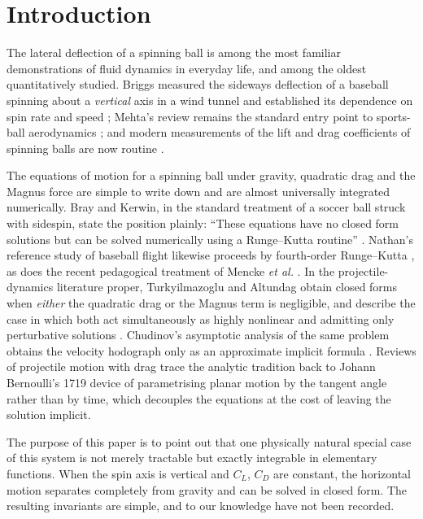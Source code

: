 \documentclass[aip,amsmath,amssymb,preprint,floatfix]{revtex4-2}
\begin{document}
\section{Introduction}
\label{sec:intro}

The lateral deflection of a spinning ball is among the most familiar demonstrations
of fluid dynamics in everyday life, and among the oldest quantitatively studied.
Briggs measured the sideways deflection of a baseball spinning about a
\emph{vertical} axis in a wind tunnel and established its dependence on spin rate
and speed \cite{Briggs1959}; Mehta's review remains the standard entry point to
sports-ball aerodynamics \cite{Mehta1985}; and modern measurements of the lift and
drag coefficients of spinning balls are now routine \cite{Nathan2008,KensrudSmith2018}.

The equations of motion for a spinning ball under gravity, quadratic drag and the
Magnus force are simple to write down and are almost universally integrated
numerically. Bray and Kerwin, in the standard treatment of a soccer ball struck
with sidespin, state the position plainly: ``These equations have no closed form
solutions but can be solved numerically using a Runge--Kutta routine''
\cite{BrayKerwin2003}. Nathan's reference study of baseball flight likewise
proceeds by fourth-order Runge--Kutta \cite{Nathan2008}, as does the recent
pedagogical treatment of Mencke \textit{et al.} \cite{Mencke2020}. In the
projectile-dynamics literature proper, Turkyilmazoglu and Altundag obtain closed
forms when \emph{either} the quadratic drag or the Magnus term is negligible, and
describe the case in which both act simultaneously as highly nonlinear and
admitting only perturbative solutions \cite{Turkyilmazoglu2020}. Chudinov's
asymptotic analysis of the same problem obtains the velocity hodograph only as an
approximate implicit formula \cite{Chudinov2024}. Reviews of projectile motion with
drag \cite{Lubarda2022,Chudinov2022} trace the analytic tradition back to Johann
Bernoulli's 1719 device of parametrising planar motion by the tangent angle rather
than by time, which decouples the equations at the cost of leaving the solution
implicit.

The purpose of this paper is to point out that one physically natural special case
of this system is not merely tractable but exactly integrable in elementary
functions. When the spin axis is vertical and $C_L$, $C_D$ are constant, the
horizontal motion separates completely from gravity and can be solved in closed
form. The resulting invariants are simple, and to our knowledge have not been
recorded.
\end{document}
